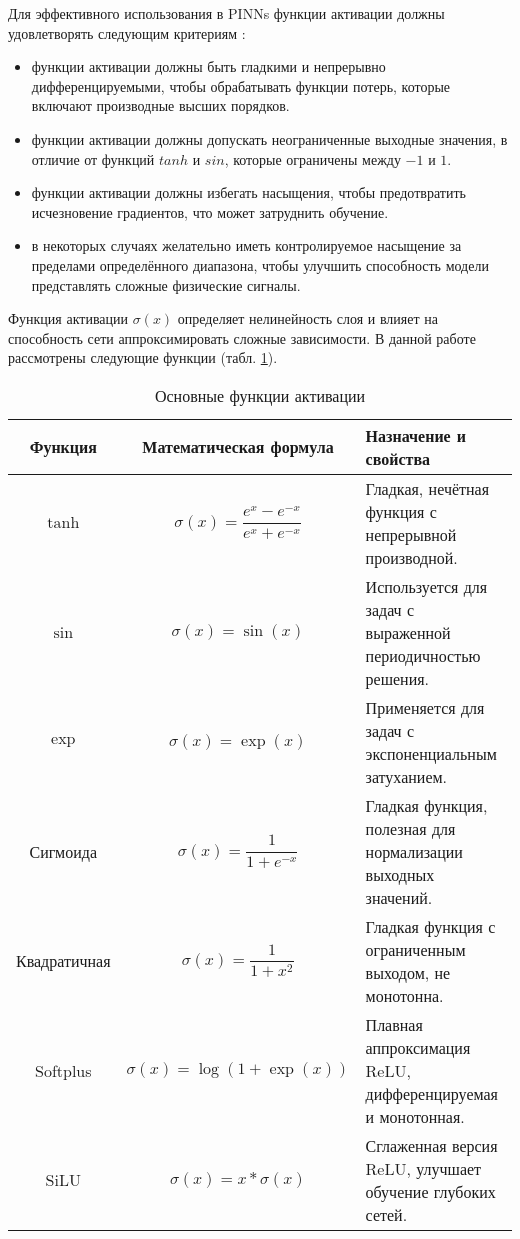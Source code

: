 Для эффективного использования в PINNs функции активации должны удовлетворять следующим
критериям \cite{0d752c79fb816703274a3d37f85a85689a2a9405}:
\begin{itemize}
    \item функции активации должны быть гладкими и
    непрерывно дифференцируемыми, чтобы обрабатывать функции потерь, которые включают
    производные высших порядков.
    \item функции активации должны допускать неограниченные
    выходные значения, в отличие от функций $tanh$ и $sin$, которые ограничены между $-1$ и $1$.
    \item функции активации должны избегать насыщения, чтобы предотвратить
    исчезновение градиентов, что может затруднить обучение.
    \item в некоторых случаях желательно иметь контролируемое насыщение за пределами определённого
    диапазона, чтобы улучшить способность модели представлять сложные физические сигналы.
\end{itemize}


Функция активации $\sigma(x)$ определяет нелинейность слоя и влияет на способность
сети аппроксимировать сложные зависимости. В данной работе рассмотрены следующие функции
(табл. \ref{table:act_basic}).

\begin{table}[h!]
    \centering
    \renewcommand{\arraystretch}{1.5}
    \begin{tabular}{|c|c|p{7cm}|}
    \hline
    \textbf{Функция} & \textbf{Математическая формула} & \textbf{Назначение и свойства} \\
    \hline
    $\tanh$ & $\sigma(x) = \dfrac{e^{x} - e^{-x}}{e^{x} + e^{-x}}$ & Гладкая, нечётная функция с непрерывной производной. \\
    \hline
    $\sin$ & $\sigma(x) = \sin(x)$ & Используется для задач с выраженной периодичностью решения. \\
    \hline
    $\exp$ & $\sigma(x) = \exp(x)$ & Применяется для задач с экспоненциальным затуханием. \\
    \hline
    Сигмоида & $\sigma(x) = \dfrac{1}{1 + e^{-x}}$ & Гладкая функция, полезная для нормализации выходных значений. \\
    \hline
    Квадратичная & $\sigma(x) = \dfrac{1}{1 + x^2}$ & Гладкая функция с ограниченным выходом, не монотонна. \\
    \hline
    Softplus & $\sigma(x) = \log(1 + \exp(x))$ & Плавная аппроксимация ReLU, дифференцируемая и монотонная. \\
    \hline
    SiLU & $\sigma(x) = x * \sigma(x)$ & Сглаженная версия ReLU, улучшает обучение глубоких сетей. \\
    \hline
    \end{tabular}
    \caption{Основные функции активации \cite{tensorflow2015-whitepaper}}
    \label{table:act_basic}
\end{table}

